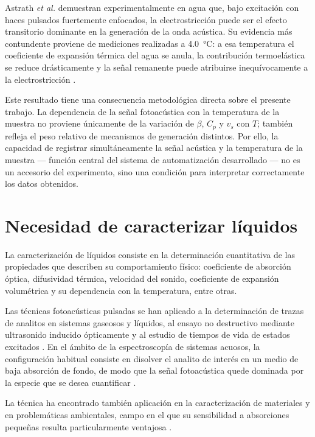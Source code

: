 Astrath \textit{et al.} demuestran experimentalmente en agua que,
bajo excitación con haces pulsados fuertemente enfocados, la
electrostricción puede ser el efecto transitorio dominante en la
generación de la onda acústica. Su evidencia más contundente
proviene de mediciones realizadas a \SI{4.0}{\celsius}: a esa
temperatura el coeficiente de expansión térmica del agua se anula,
la contribución termoelástica se reduce drásticamente y la señal
remanente puede atribuirse inequívocamente a la electrostricción
\cite{Astrath2023}.

Este resultado tiene una consecuencia metodológica directa sobre el
presente trabajo. La dependencia de la señal fotoacústica con la
temperatura de la muestra no proviene únicamente de la variación de
$\beta$, $C_p$ y $v_s$ con $T$; también refleja el peso relativo de
mecanismos de generación distintos. Por ello, la capacidad de
registrar simultáneamente la señal acústica y la temperatura de la
muestra --- función central del sistema de automatización
desarrollado --- no es un accesorio del experimento, sino una
condición para interpretar correctamente los datos obtenidos.

\section{Necesidad de caracterizar líquidos}
\label{sec:necesidad_caracterizacion}

La caracterización de líquidos consiste en la determinación
cuantitativa de las propiedades que describen su comportamiento
físico: coeficiente de absorción óptica, difusividad térmica,
velocidad del sonido, coeficiente de expansión volumétrica y su
dependencia con la temperatura, entre otras.

Las técnicas fotoacústicas pulsadas se han aplicado a la
determinación de trazas de analitos en sistemas gaseosos y
líquidos, al ensayo no destructivo mediante ultrasonido inducido
ópticamente y al estudio de tiempos de vida de estados excitados
\cite{Quan1994}. En el ámbito de la espectroscopía de sistemas
acuosos, la configuración habitual consiste en disolver el analito
de interés en un medio de baja absorción de fondo, de modo que la
señal fotoacústica quede dominada por la especie que se desea
cuantificar \cite{Quan1994}.

La técnica ha encontrado también aplicación en la caracterización
de materiales y en problemáticas ambientales, campo en el que su
sensibilidad a absorciones pequeñas resulta particularmente
ventajosa \cite{Marin2008,Tam1986}.


